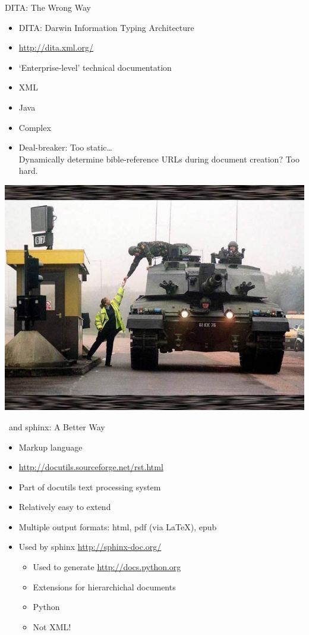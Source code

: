 \documentclass{beamer}
\begin{document}
    
\begin{frame}{DITA: The Wrong Way}
    \begin{itemize}
    \item DITA: Darwin Information Typing Architecture
    \item \url{http://dita.xml.org/}
    \item `Enterprise-level' technical documentation
    \item XML
    \item Java
    \item Complex
    \item Deal-breaker: Too static\ldots\\
        Dynamically determine bible-reference URLs during document creation? Too hard.
    \end{itemize}
\end{frame}

\begin{frame}[plain]
    \centerline{\includegraphics[keepaspectratio=true, width=\paperwidth]{tank-toll.jpg}}
\end{frame}

\begin{frame}{\rst\ and sphinx: A Better Way}
\begin{itemize}
\item Markup language
\item \url{http://docutils.sourceforge.net/rst.html}
\item Part of docutils text processing system
\item Relatively easy to extend
\item Multiple output formats: html, pdf (via \LaTeX), epub
\item Used by sphinx \url{http://sphinx-doc.org/}
\begin{itemize}
\item Used to generate \url{http://docs.python.org}
\item Extensions for hierarchichal documents
\item Python
\item Not XML!
\end{itemize}
\end{itemize}
\end{frame}
\end{document}
